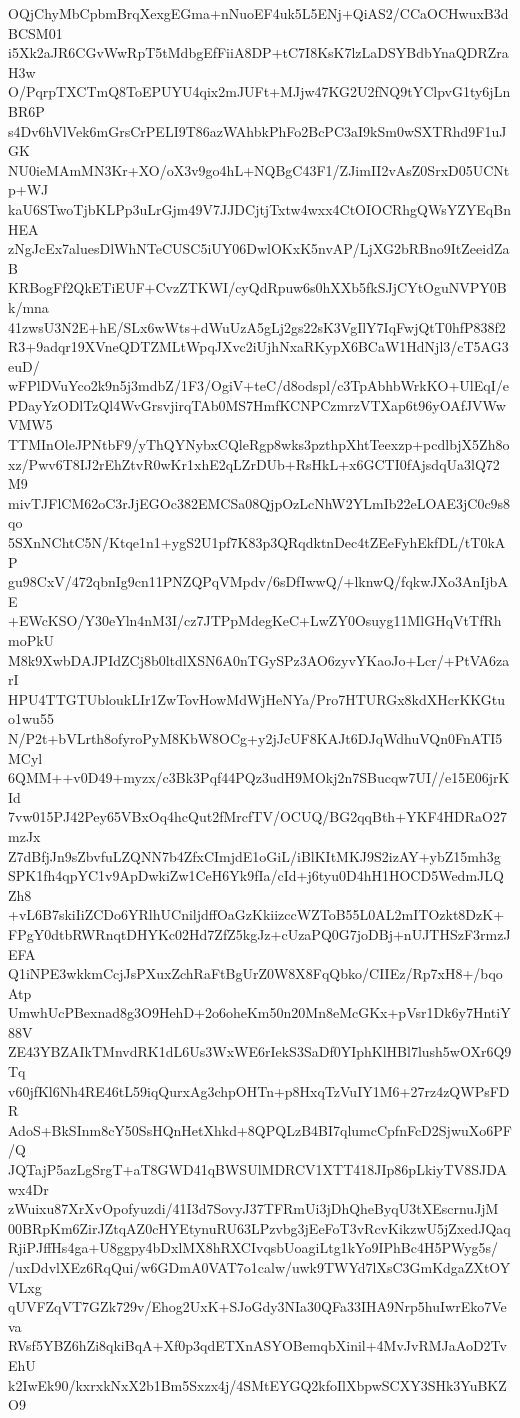 OQjChyMbCpbmBrqXexgEGma+nNuoEF4uk5L5ENj+QiAS2/CCaOCHwuxB3dBCSM01
i5Xk2aJR6CGvWwRpT5tMdbgEfFiiA8DP+tC7I8KsK7lzLaDSYBdbYnaQDRZraH3w
O/PqrpTXCTmQ8ToEPUYU4qix2mJUFt+MJjw47KG2U2fNQ9tYClpvG1ty6jLnBR6P
s4Dv6hVlVek6mGrsCrPELI9T86azWAhbkPhFo2BcPC3aI9kSm0wSXTRhd9F1uJGK
NU0ieMAmMN3Kr+XO/oX3v9go4hL+NQBgC43F1/ZJimII2vAsZ0SrxD05UCNtp+WJ
kaU6STwoTjbKLPp3uLrGjm49V7JJDCjtjTxtw4wxx4CtOIOCRhgQWsYZYEqBnHEA
zNgJcEx7aluesDlWhNTeCUSC5iUY06DwlOKxK5nvAP/LjXG2bRBno9ItZeeidZaB
KRBogFf2QkETiEUF+CvzZTKWI/cyQdRpuw6s0hXXb5fkSJjCYtOguNVPY0Bk/mna
41zwsU3N2E+hE/SLx6wWts+dWuUzA5gLj2gs22sK3VgIlY7IqFwjQtT0hfP838f2
R3+9adqr19XVneQDTZMLtWpqJXvc2iUjhNxaRKypX6BCaW1HdNjl3/cT5AG3euD/
wFPlDVuYco2k9n5j3mdbZ/1F3/OgiV+teC/d8odspl/c3TpAbhbWrkKO+UlEqI/e
PDayYzODlTzQl4WvGrsvjirqTAb0MS7HmfKCNPCzmrzVTXap6t96yOAfJVWwVMW5
TTMInOleJPNtbF9/yThQYNybxCQleRgp8wks3pzthpXhtTeexzp+pcdlbjX5Zh8o
xz/Pwv6T8IJ2rEhZtvR0wKr1xhE2qLZrDUb+RsHkL+x6GCTI0fAjsdqUa3lQ72M9
mivTJFlCM62oC3rJjEGOc382EMCSa08QjpOzLcNhW2YLmIb22eLOAE3jC0c9s8qo
5SXnNChtC5N/Ktqe1n1+ygS2U1pf7K83p3QRqdktnDec4tZEeFyhEkfDL/tT0kAP
gu98CxV/472qbnIg9cn11PNZQPqVMpdv/6sDfIwwQ/+lknwQ/fqkwJXo3AnIjbAE
+EWcKSO/Y30eYln4nM3I/cz7JTPpMdegKeC+LwZY0Osuyg11MlGHqVtTfRhmoPkU
M8k9XwbDAJPIdZCj8b0ltdlXSN6A0nTGySPz3AO6zyvYKaoJo+Lcr/+PtVA6zarI
HPU4TTGTUbloukLIr1ZwTovHowMdWjHeNYa/Pro7HTURGx8kdXHcrKKGtuo1wu55
N/P2t+bVLrth8ofyroPyM8KbW8OCg+y2jJcUF8KAJt6DJqWdhuVQn0FnATI5MCyl
6QMM++v0D49+myzx/c3Bk3Pqf44PQz3udH9MOkj2n7SBucqw7UI//e15E06jrKId
7vw015PJ42Pey65VBxOq4hcQut2fMrcfTV/OCUQ/BG2qqBth+YKF4HDRaO27mzJx
Z7dBfjJn9sZbvfuLZQNN7b4ZfxCImjdE1oGiL/iBlKItMKJ9S2izAY+ybZ15mh3g
SPK1fh4qpYC1v9ApDwkiZw1CeH6Yk9fIa/cId+j6tyu0D4hH1HOCD5WedmJLQZh8
+vL6B7skiIiZCDo6YRlhUCniljdffOaGzKkiizccWZToB55L0AL2mITOzkt8DzK+
FPgY0dtbRWRnqtDHYKc02Hd7ZfZ5kgJz+cUzaPQ0G7joDBj+nUJTHSzF3rmzJEFA
Q1iNPE3wkkmCcjJsPXuxZchRaFtBgUrZ0W8X8FqQbko/CIIEz/Rp7xH8+/bqoAtp
UmwhUcPBexnad8g3O9HehD+2o6oheKm50n20Mn8eMcGKx+pVsr1Dk6y7HntiY88V
ZE43YBZAIkTMnvdRK1dL6Us3WxWE6rIekS3SaDf0YIphKlHBl7lush5wOXr6Q9Tq
v60jfKl6Nh4RE46tL59iqQurxAg3chpOHTn+p8HxqTzVuIY1M6+27rz4zQWPsFDR
AdoS+BkSInm8cY50SsHQnHetXhkd+8QPQLzB4BI7qlumcCpfnFcD2SjwuXo6PF/Q
JQTajP5azLgSrgT+aT8GWD41qBWSUlMDRCV1XTT418JIp86pLkiyTV8SJDAwx4Dr
zWuixu87XrXvOpofyuzdi/41I3d7SovyJ37TFRmUi3jDhQheByqU3tXEscrnuJjM
00BRpKm6ZirJZtqAZ0cHYEtynuRU63LPzvbg3jEeFoT3vRcvKikzwU5jZxedJQaq
RjiPJffHs4ga+U8ggpy4bDxlMX8hRXCIvqsbUoagiLtg1kYo9IPhBc4H5PWyg5s/
/uxDdvlXEz6RqQui/w6GDmA0VAT7o1calw/uwk9TWYd7lXsC3GmKdgaZXtOYVLxg
qUVFZqVT7GZk729v/Ehog2UxK+SJoGdy3NIa30QFa33IHA9Nrp5huIwrEko7Veva
RVsf5YBZ6hZi8qkiBqA+Xf0p3qdETXnASYOBemqbXinil+4MvJvRMJaAoD2TvEhU
k2IwEk90/kxrxkNxX2b1Bm5Sxzx4j/4SMtEYGQ2kfoIlXbpwSCXY3SHk3YuBKZO9
